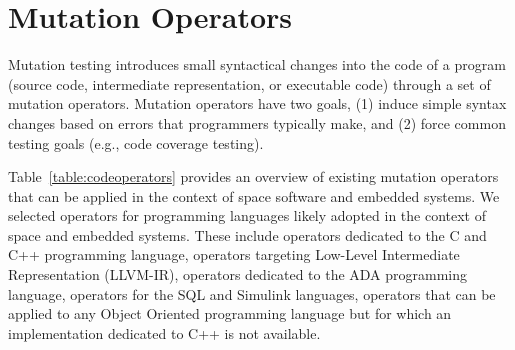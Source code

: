 
\section{Mutation Operators}
\label{sec:operators}

Mutation testing introduces small syntactical changes into the code of a program (source code, intermediate representation, or executable code) through a set of mutation operators.
Mutation operators have two goals, (1) induce simple syntax changes based on errors that programmers typically make, and (2) force common testing goals (e.g., code coverage testing).

Table~\ref{table:codeoperators} provides an overview of existing mutation operators that can be applied in the context of space software and embedded systems.
We selected operators for programming languages likely adopted in the context of space and embedded systems. These include operators dedicated to the C and C++ programming language, operators targeting Low-Level Intermediate Representation (LLVM-IR), operators dedicated to the ADA programming language, operators for the SQL and Simulink languages, operators that can be applied to any Object Oriented programming language but for which an implementation dedicated to C++ is not available.

